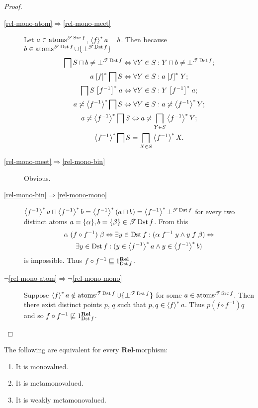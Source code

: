 \begin{proof}
~
\begin{description}
\item [{\ref{rel-mono-atom}$\Rightarrow$\ref{rel-mono-meet}}] Let $a\in\operatorname{atoms}^{\mathscr{T}\operatorname{Src} f}$,
$\left\langle f\right\rangle ^{\ast}a=b$. Then because $b\in\operatorname{atoms}^{\mathscr{T}\operatorname{Dst} f}\cup\{\bot^{\mathscr{T}\operatorname{Dst} f}\}$
\begin{gather*}
\bigsqcap S\sqcap b\ne\bot^{\mathscr{T}\operatorname{Dst} f}\Leftrightarrow\forall Y\in S:Y\sqcap b\ne\bot^{\mathscr{T}\operatorname{Dst} f};\\
a\mathrel{\left[f\right]^{\ast}}\bigsqcap S\Leftrightarrow\forall Y\in S:a\mathrel{\left[f\right]^{\ast}}Y;\\
\bigsqcap S\mathrel{\left[f^{-1}\right]^{\ast}}a\Leftrightarrow\forall Y\in S:Y\mathrel{\left[f^{-1}\right]^{\ast}}a;\\
a\not\asymp\left\langle f^{-1}\right\rangle ^{\ast}\bigsqcap S\Leftrightarrow\forall Y\in S:a\not\asymp\left\langle f^{-1}\right\rangle ^{\ast}Y;\\
a\not\asymp\left\langle f^{-1}\right\rangle ^{\ast}\bigsqcap S\Leftrightarrow a\not\asymp\bigsqcap_{Y\in S}\left\langle f^{-1}\right\rangle ^{\ast}Y;\\
\left\langle f^{-1}\right\rangle ^{\ast}\bigsqcap S=\bigsqcap_{X\in S}\left\langle f^{-1}\right\rangle ^{\ast}X.
\end{gather*}

\item [{\ref{rel-mono-meet}$\Rightarrow$\ref{rel-mono-bin}}] Obvious.
\item [{\ref{rel-mono-bin}$\Rightarrow$\ref{rel-mono-mono}}] $\left\langle f^{-1}\right\rangle ^{\ast}a\sqcap\left\langle f^{-1}\right\rangle ^{\ast}b=\left\langle f^{-1}\right\rangle ^{\ast}(a\sqcap b)=\left\langle f^{-1}\right\rangle ^{\ast}\bot^{\mathscr{T}\operatorname{Dst} f}$
for every two distinct atoms $a=\{\alpha\},b=\{\beta\}\in\mathscr{T}\operatorname{Dst} f$.
From this 
\begin{multline*}
\alpha\mathrel{(f\circ f^{-1})}\beta\Leftrightarrow\exists y\in\operatorname{Dst} f:(\alpha\mathrel{f^{-1}}y\land y\mathrel{f}\beta)\Leftrightarrow\\
\exists y\in\operatorname{Dst} f:(y\in\left\langle f^{-1}\right\rangle ^{\ast}a\land y\in\left\langle f^{-1}\right\rangle ^{\ast}b)
\end{multline*}
 is impossible. Thus $f\circ f^{-1}\sqsubseteq1_{\operatorname{Dst} f}^{\mathbf{Rel}}$.
\item [{$\lnot$\ref{rel-mono-atom}$\Rightarrow\lnot$\ref{rel-mono-mono}}] Suppose
$\left\langle f\right\rangle ^{\ast}a\notin\operatorname{atoms}^{\mathscr{T}\operatorname{Dst} f}\cup\{\bot^{\mathscr{T}\operatorname{Dst} f}\}$
for some $a\in\operatorname{atoms}^{\mathscr{T}\operatorname{Src} f}$. Then there exist distinct
points $p$, $q$ such that $p,q\in\left\langle f\right\rangle ^{\ast}a$. Thus $p\mathrel{(f\circ f^{-1})}q$
and so $f\circ f^{-1}\not\sqsubseteq1_{\operatorname{Dst} f}^{\mathbf{Rel}}$.
\end{description}
\end{proof}
\begin{prop}
The following are equivalent for every $\mathbf{Rel}$-morphism:
\begin{enumerate}
\item \label{rel-mv}It is monovalued.
\item \label{rel-mmv}It is metamonovalued.
\item \label{rel-wmmv}It is weakly metamonovalued.
\end{enumerate}
\end{prop}
